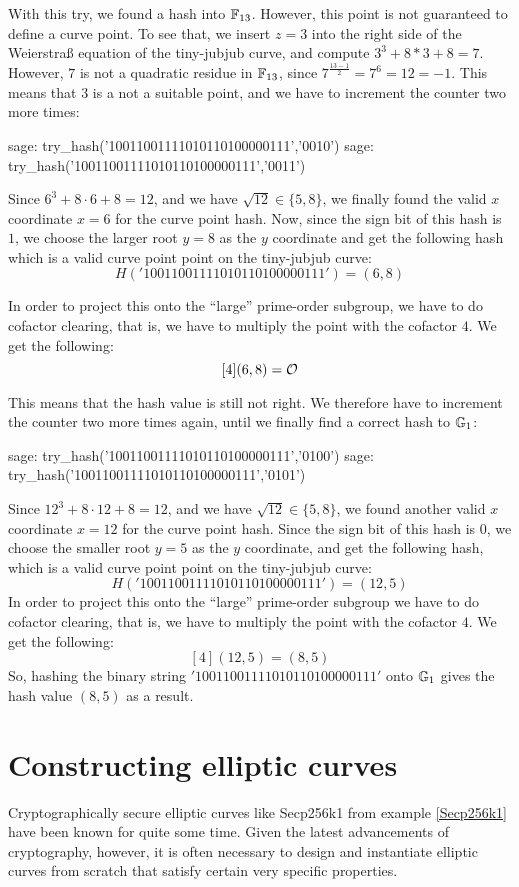 \begin{example}
With this try, we found a hash into $\mathbb{F}_{13}$. However, this point is not guaranteed to define a curve point. To see that, we insert $z=3$ into the right side of the Weierstraß equation of the tiny-jubjub curve, and compute $3^3 + 8*3 + 8 = 7$. However, $7$ is not a quadratic residue in $\mathbb{F}_{13}$, since $7^{\frac{13-1}{2}}=7^6=12=-1$. This means that $3$ is a not a suitable point, and we have to increment the counter two more times: 
\begin{sagecommandline}
sage: try_hash('10011001111010110100000111','0010')
sage: try_hash('10011001111010110100000111','0011')
\end{sagecommandline}
Since $6^3 + 8\cdot 6 + 8 = 12$, and we have $\sqrt{12}\in\{5, 8\}$, we finally found the valid $x$ coordinate $x=6$ for the curve point hash. Now, since the sign bit of this hash is $1$, we choose the larger root $y=8$ as the $y$ coordinate and get the following hash which is a valid curve point point on the tiny-jubjub curve:
$$
H('10011001111010110100000111') = (6,8)
$$

In order to project this onto the ``large'' prime-order subgroup, we have to do cofactor clearing, that is, we have to multiply the point with the cofactor $4$. We get the following:
$$
[4](6,8) = \mathcal{O}
$$ 

This means that the hash value is still not right. We therefore have to increment the counter two more times again, until we finally find a correct hash to $\mathbb{G}_1$:
\begin{sagecommandline}
sage: try_hash('10011001111010110100000111','0100')
sage: try_hash('10011001111010110100000111','0101')
\end{sagecommandline}

Since $12^3 + 8\cdot 12 + 8 = 12$, and we have $\sqrt{12}\in\{5, 8\}$, we found another valid $x$ coordinate $x=12$ for the curve point hash. Since the sign bit of this hash is $0$, we choose the smaller root $y=5$ as the $y$ coordinate, and get the following hash, which is a valid curve point point on the tiny-jubjub curve:
$$
H('10011001111010110100000111') = (12,5)
$$
In order to project this onto the ``large'' prime-order subgroup we have to do cofactor clearing, that is, we have to multiply the point with the cofactor $4$. We get the following:
$$
[4](12,5) = (8,5)
$$
So, hashing the binary string $'10011001111010110100000111'$ onto $\mathbb{G}_1$ gives the hash value $(8,5)$ as a result. 
\end{example}

\section{Constructing elliptic curves} Cryptographically secure elliptic curves like Secp256k1 from example \ref{Secp256k1} have been known for quite some time. Given the latest advancements of cryptography, however, it is often necessary to design and instantiate elliptic curves from scratch that satisfy certain very specific properties. 


